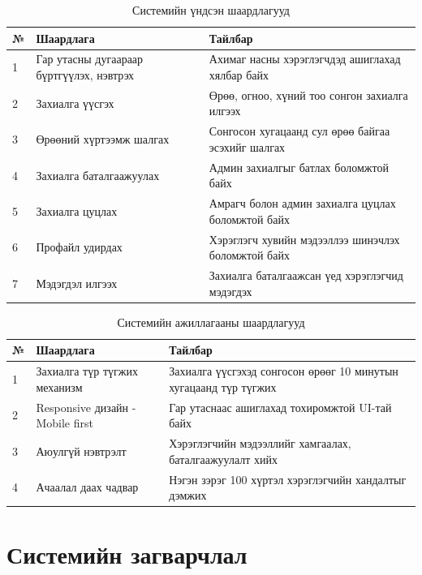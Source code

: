 \begin{table}[H]
  \centering
  \caption{Системийн үндсэн шаардлагууд}
  \label{tab:functional-req}
  \begin{tabular}{p{0.6cm} p{5.5cm} p{8.5cm}}
    \toprule
    \textbf{№} & \textbf{Шаардлага} & \textbf{Тайлбар} \\
    \midrule
    1 & Гар утасны дугаараар бүртгүүлэх, нэвтрэх & Ахимаг насны хэрэглэгчдэд ашиглахад хялбар байх \\
    \midrule
    2 & Захиалга үүсгэх       & Өрөө, огноо, хүний тоо сонгон захиалга илгээх \\
    \midrule
    3 & Өрөөний хүртээмж шалгах & Сонгосон хугацаанд сул өрөө байгаа эсэхийг шалгах \\
    \midrule
    4 & Захиалга баталгаажуулах & Админ захиалгыг батлах боломжтой байх \\
    \midrule
    5 & Захиалга цуцлах       & Амрагч болон админ захиалга цуцлах боломжтой байх \\
    \midrule
    6 & Профайл удирдах       & Хэрэглэгч хувийн мэдээллээ шинэчлэх боломжтой байх \\
    \midrule
    7 & Мэдэгдэл илгээх       & Захиалга баталгаажсан үед хэрэглэгчид мэдэгдэх \\
    \bottomrule
  \end{tabular}
\end{table}

\begin{table}[H]
  \centering
  \caption{Системийн ажиллагааны шаардлагууд}
  \label{tab:nonfunctional-req}
  \begin{tabular}{p{0.6cm} p{5.5cm} p{8.5cm}}
    \toprule
    \textbf{№} & \textbf{Шаардлага} & \textbf{Тайлбар} \\
    \midrule
    1 & Захиалга түр түгжих механизм & Захиалга үүсгэхэд сонгосон өрөөг 10 минутын хугацаанд түр түгжих \\
    \midrule
    2 & Responsive дизайн - Mobile first     & Гар утаснаас ашиглахад тохиромжтой UI-тай байх \\
    \midrule
    3 & Аюулгүй нэвтрэлт     & Хэрэглэгчийн мэдээллийг хамгаалах, баталгаажуулалт хийх \\
    \midrule
    4 & Ачаалал даах чадвар   & Нэгэн зэрэг 100 хүртэл хэрэглэгчийн хандалтыг дэмжих \\
    \bottomrule
  \end{tabular}
\end{table}

\section{Системийн загварчлал}

